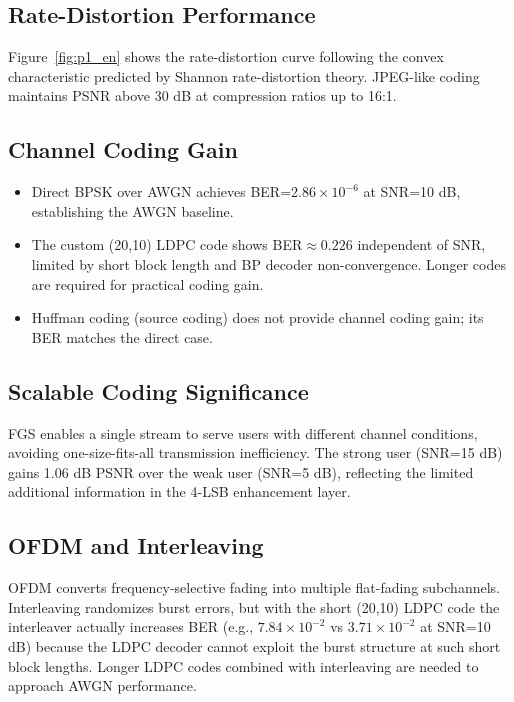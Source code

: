 \documentclass[12pt, a4paper]{article}
\begin{document}
\subsection{Rate-Distortion Performance}

Figure~\ref{fig:p1_en} shows the rate-distortion curve following the convex characteristic predicted by Shannon rate-distortion theory. JPEG-like coding maintains PSNR above 30 dB at compression ratios up to 16:1.

\subsection{Channel Coding Gain}

\begin{itemize}
    \item Direct BPSK over AWGN achieves BER=$2.86\times10^{-6}$ at SNR=10 dB, establishing the AWGN baseline.
    \item The custom (20,10) LDPC code shows BER$\approx 0.226$ independent of SNR, limited by short block length and BP decoder non-convergence. Longer codes are required for practical coding gain.
    \item Huffman coding (source coding) does not provide channel coding gain; its BER matches the direct case.
\end{itemize}

\subsection{Scalable Coding Significance}

FGS enables a single stream to serve users with different channel conditions, avoiding one-size-fits-all transmission inefficiency. The strong user (SNR=15 dB) gains 1.06 dB PSNR over the weak user (SNR=5 dB), reflecting the limited additional information in the 4-LSB enhancement layer.

\subsection{OFDM and Interleaving}

OFDM converts frequency-selective fading into multiple flat-fading subchannels. Interleaving randomizes burst errors, but with the short (20,10) LDPC code the interleaver actually increases BER (e.g., $7.84\times10^{-2}$ vs $3.71\times10^{-2}$ at SNR=10 dB) because the LDPC decoder cannot exploit the burst structure at such short block lengths. Longer LDPC codes combined with interleaving are needed to approach AWGN performance.
\end{document}
